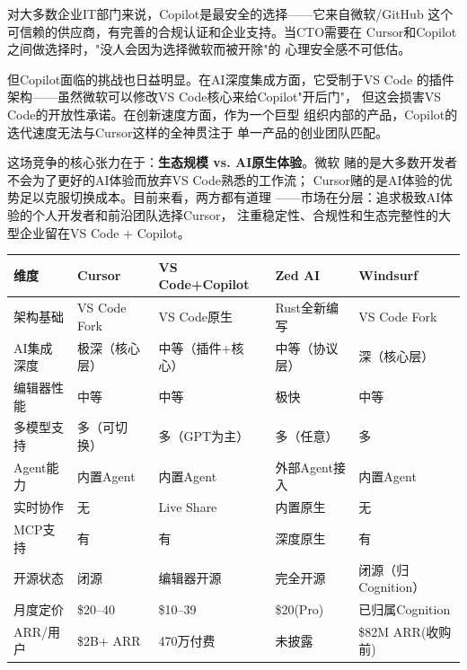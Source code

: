 对大多数企业IT部门来说，Copilot是最安全的选择——它来自微软/GitHub
这个可信赖的供应商，有完善的合规认证和企业支持。当CTO需要在
Cursor和Copilot之间做选择时，"没人会因为选择微软而被开除"的
心理安全感不可低估。

但Copilot面临的挑战也日益明显。在AI深度集成方面，它受制于VS Code
的插件架构——虽然微软可以修改VS Code核心来给Copilot"开后门"，
但这会损害VS Code的开放性承诺。在创新速度方面，作为一个巨型
组织内部的产品，Copilot的迭代速度无法与Cursor这样的全神贯注于
单一产品的创业团队匹配。

这场竞争的核心张力在于：\textbf{生态规模 vs. AI原生体验}。微软
赌的是大多数开发者不会为了更好的AI体验而放弃VS Code熟悉的工作流；
Cursor赌的是AI体验的优势足以克服切换成本。目前来看，两方都有道理
——市场在分层：追求极致AI体验的个人开发者和前沿团队选择Cursor，
注重稳定性、合规性和生态完整性的大型企业留在VS Code + Copilot。

\begin{keybox}[AI 代码编辑器全方位对比]
\small
\begin{tabularx}{\textwidth}{l X X X X}
\toprule
\rowcolor{figLightGray}
\textbf{维度} & \textbf{Cursor} & \textbf{VS Code+Copilot}
  & \textbf{Zed AI} & \textbf{Windsurf} \\
\midrule
架构基础     & VS Code Fork  & VS Code原生    & Rust全新编写   & VS Code Fork \\
AI集成深度   & 极深（核心层）& 中等（插件+核心）& 中等（协议层） & 深（核心层）\\
编辑器性能   & 中等           & 中等           & 极快           & 中等 \\
多模型支持   & 多（可切换）   & 多（GPT为主）  & 多（任意）     & 多 \\
Agent能力    & 内置Agent      & 内置Agent      & 外部Agent接入  & 内置Agent \\
实时协作     & 无             & Live Share     & 内置原生       & 无 \\
MCP支持      & 有             & 有             & 深度原生       & 有 \\
开源状态     & 闭源           & 编辑器开源     & 完全开源       & 闭源（归Cognition）\\
月度定价     & \$20--40       & \$10--39       & \$20(Pro)      & 已归属Cognition \\
ARR/用户     & \$2B+ ARR      & 470万付费      & 未披露         & \$82M ARR(收购前) \\
\bottomrule
\end{tabularx}
\end{keybox}



